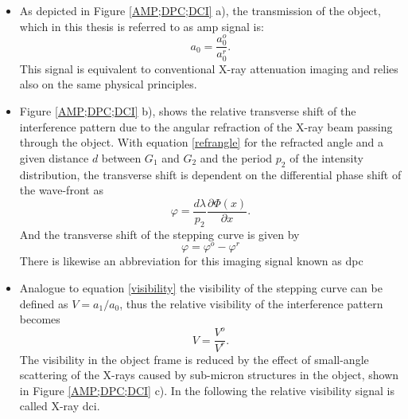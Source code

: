 \begin{itemize}
	\item As depicted in Figure \ref{AMP;DPC;DCI} a), the transmission of the object, which in this thesis is referred to as \acrshort{amp} signal is:
	\begin{equation}
	a_{0} = \frac{a_{0}^{o}}{a_{0}^{r}}.
	\end{equation}
	This signal is equivalent to conventional X-ray attenuation imaging and relies also on the same physical principles.  
	\item Figure \ref{AMP;DPC;DCI} b), shows the relative transverse shift of the interference pattern due to the angular refraction of the X-ray beam passing through the object. With equation \ref{refrangle} for the refracted angle and a given distance $d$ between $G_{1}$ and $G_{2}$ and the period $p_{2}$ of the intensity distribution, the transverse shift is dependent on the differential phase shift of the wave-front as
	\begin{equation}
	\varphi = \frac{d \lambda}{p_{2}}\frac{\partial\Phi(x)}{\partial x}. 
	\end{equation}
	And the transverse shift of the stepping curve is given by
	\begin{equation}
	\varphi = \varphi^{o}-\varphi^{r}
	\end{equation}
	There is likewise an abbreviation for this imaging signal known as \gls{dpc}
	\item Analogue to equation \ref{visibility} the visibility of the stepping curve can be defined as $V  =a_{1}/a_{0}$, thus the relative visibility of the interference pattern becomes \citep{Pfeiffer2008}
	\begin{equation}
	V = \frac{V^{o}}{V^{r}} .
	\end{equation}  
	The visibility in the object frame is reduced by the effect of small-angle scattering of the X-rays caused by sub-micron structures in the object, shown in Figure \ref{AMP;DPC;DCI} c). In the following the relative visibility signal is called X-ray \gls{dci}.  
\end{itemize}

